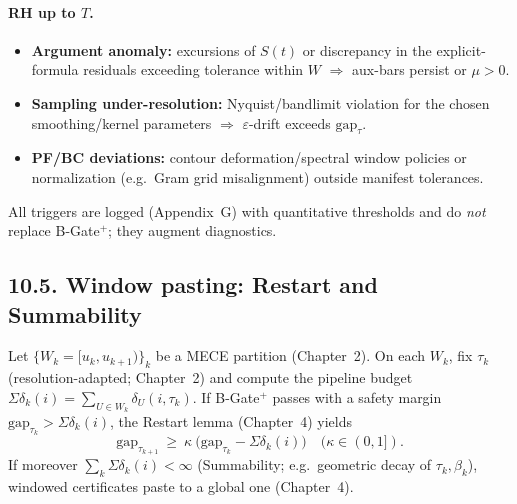 \documentclass[11pt]{article}
\numberwithin{equation}{section}
\theoremstyle{plain}
\theoremstyle{definition}
\theoremstyle{remark}
\DeclareRobustCommand{\hyp}{\nobreakdash-}
\theoremstyle{plain}
\theoremstyle{definition}
\numberwithin{equation}{section}
\theoremstyle{definition}
\numberwithin{equation}{section}
\theoremstyle{plain}
\theoremstyle{definition}
\theoremstyle{remark}
\begin{document}
\paragraph{RH up to \(T\).}
\begin{itemize}
  \item \textbf{Argument anomaly:} excursions of \(S(t)\) or discrepancy in the explicit\hyp formula residuals exceeding tolerance within \(W\) \(\Rightarrow\) aux\hyp bars persist or \(\mu>0\).
  \item \textbf{Sampling under\hyp resolution:} Nyquist/bandlimit violation for the chosen smoothing/kernel parameters \(\Rightarrow\) \(\varepsilon\)\hyp drift exceeds \(\mathrm{gap}_\tau\).
  \item \textbf{PF/BC deviations:} contour deformation/spectral window policies or normalization (e.g.\ Gram grid misalignment) outside manifest tolerances.
\end{itemize}
All triggers are logged (Appendix~G) with quantitative thresholds and do \emph{not} replace B\hyp Gate\(^{+}\); they augment diagnostics.

\subsection*{10.5. Window pasting: Restart and Summability}
Let \(\{W_k=[u_k,u_{k+1})\}_k\) be a MECE partition (Chapter~2). On each \(W_k\), fix \(\tau_k\) (resolution\hyp adapted; Chapter~2) and compute the pipeline budget \(\Sigma\delta_k(i)=\sum_{U\in W_k}\delta_U(i,\tau_k)\). If B\hyp Gate\(^{+}\) passes with a safety margin \(\mathrm{gap}_{\tau_k}>\Sigma\delta_k(i)\), the Restart lemma (Chapter~4) yields
\[
\mathrm{gap}_{\tau_{k+1}}\ \ge\ \kappa\ \bigl(\mathrm{gap}_{\tau_k}-\Sigma\delta_k(i)\bigr)\quad(\kappa\in(0,1]).
\]
If moreover \(\sum_k\Sigma\delta_k(i)<\infty\) (Summability; e.g.\ geometric decay of \(\tau_k,\beta_k\)), windowed certificates paste to a global one (Chapter~4).
\end{document}
